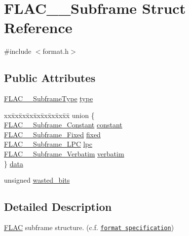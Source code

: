 \hypertarget{struct_f_l_a_c_____subframe}{}\section{F\+L\+A\+C\+\_\+\+\_\+\+Subframe Struct Reference}
\label{struct_f_l_a_c_____subframe}


{\ttfamily \#include $<$format.\+h$>$}

\subsection*{Public Attributes}
\begin{DoxyCompactItemize}
\item 
\hyperlink{group__flac__format_ga1f431eaf213e74d7747589932d263348}{F\+L\+A\+C\+\_\+\+\_\+\+Subframe\+Type} \hyperlink{struct_f_l_a_c_____subframe_a1de133ee69f416636e24a990d4bd6b44}{type}
\item 
\begin{tabbing}
xx\=xx\=xx\=xx\=xx\=xx\=xx\=xx\=xx\=\kill
union \{\\
\>\hyperlink{struct_f_l_a_c_____subframe___constant}{FLAC\_\_Subframe\_Constant} \hyperlink{struct_f_l_a_c_____subframe_a2b6c0b6a78e11a3f07ad018ebdbae053}{constant}\\
\>\hyperlink{struct_f_l_a_c_____subframe___fixed}{FLAC\_\_Subframe\_Fixed} \hyperlink{struct_f_l_a_c_____subframe_a62b0c96288ec264ca09aba6c7c26fc0b}{fixed}\\
\>\hyperlink{struct_f_l_a_c_____subframe___l_p_c}{FLAC\_\_Subframe\_LPC} \hyperlink{struct_f_l_a_c_____subframe_a298cb7680a387b1b95815cd51648f400}{lpc}\\
\>\hyperlink{struct_f_l_a_c_____subframe___verbatim}{FLAC\_\_Subframe\_Verbatim} \hyperlink{struct_f_l_a_c_____subframe_ae7b7d3263298a9326f3ac3e9d56b2a6c}{verbatim}\\
\} \hyperlink{struct_f_l_a_c_____subframe_ad29d60acad1bac7faf6987b26c816039}{data}\\

\end{tabbing}\item 
unsigned \hyperlink{struct_f_l_a_c_____subframe_a96a6848ded4e90e26d54f0dd7066c306}{wasted\+\_\+bits}
\end{DoxyCompactItemize}


\subsection{Detailed Description}
\hyperlink{namespace_f_l_a_c}{F\+L\+AC} subframe structure. (c.\+f. \href{../format.html#subframe}{\tt format specification}) 

